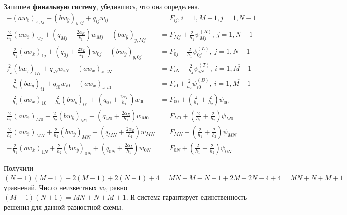 \documentclass[12pt, fleqn]{article}
\theoremstyle{definition}
\begin{document}
Запишем \textbf{финальную систему}, убедившись, что она определена.
\begin{align*}
  -\left(a w_{\overline{x}}\right)_{x, i j}-\left(b w_{\overline{y}}\right)_{y, i j}+q_{i j} w_{i j} &=F_{i j}, i=\overline{1, M-1}, j=\overline{1, N-1}\\
 \frac{2}{h_{1}}\left(a w_{\overline{x}}\right)_{M j} + \left(q_{M j}+\frac{2 \alpha_{R}}{h_{1}}\right) w_{M j}-\left(b w_{\overline{y}}\right)_{y, M j}&=F_{M j}+\frac{2}{h_{1}} \psi^{(R)}_{M j}, \; j=\overline{1, N-1} \\
-\frac{2}{h_{1}}\left(a w_{\overline{x}}\right)_{1 j}+\left(q_{0 j}+\frac{2 \alpha_{L}}{h_{1}}\right) w_{0 j}-\left(b w_{\overline{y}}\right)_{y, 0 j}&=F_{0 j}+\frac{2}{h_{1}} \psi^{(L)}_{0 j}, \; j=\overline{1, N-1}\\
\frac{2}{h_{2}}\left(b w_{\overline{y}}\right)_{i N} + q_{i N} w_{i N}-\left(a w_{\overline{x}}\right)_{x, i N}&=F_{i N}+\frac{2}{h_{2}} \psi^{(T)}_{i N},\;  i=\overline{1, M-1}  \\
-\frac{2}{h_{2}}\left(b w_{\overline{y}}\right)_{i 1}+q_{i 0} w_{i 0}-\left(a w_{\overline{x}}\right)_{x, i 0}&=F_{i 0}+\frac{2}{h_{2}} \psi^{(B)}_{i 0},\;  i=\overline{1, M-1} \\
-\frac{2}{h_{1}}\left(a w_{\overline{x}}\right)_{10} - \frac{2}{h_{2}} \left(b w_{\overline{y}}\right)_{01}+\left(q_{00}+ \frac{2\alpha_{L}}{h_{1}}\right) w_{00}&= F_{00}+\left(\frac{2}{h_{1}} + \frac{2}{h_{2}}\right) \psi_{00}\\
\frac{2}{h_{1}}\left(a w_{\overline{x}}\right)_{M 0}-\frac{2}{h_{2}}\left(b w_{\overline{y}}\right)_{M 1}+\left(q_{M 0}+\frac{2\alpha_{R}}{h_{1}}\right) w_{M 0} &= F_{M 0}+\left(\frac{2}{h_{1}}+\frac{2}{h_{2}}\right) \psi_{M 0}\\
\frac{2}{h_{1}}\left(a w_{\overline{x}}\right)_{M N}+\frac{2}{h_{2}}\left(b w_{\overline{y}}\right)_{M N}+\left(q_{M N}+\frac{2\alpha_{R}}{h_{1}}\right) w_{M N}&= F_{M N}+\left(\frac{2}{h_{1}}+\frac{2}{h_{2}}\right) \psi_{M N}\\
-\frac{2}{h_{1}}\left(a w_{\overline{x}}\right)_{1 N}+\frac{2}{h_{2}}\left(b w_{\overline{y}}\right)_{0 N}+\left(q_{0 N}+\frac{2\alpha_{L}}{h_{1}}\right) w_{0 N}&= F_{0 N}+\left(\frac{2}{h_{1}}+\frac{2}{h_{2}}\right) \psi_{0 N}
\end{align*}

Получили $(N-1)(M-1) + 2(M-1) + 2(N-1) + 4 = MN - M - N + 1 + 2M + 2N - 4 + 4 = MN + N + M + 1$ уравнений. Число неизвестных $w_{ij}$ равно $(M+1)(N+1) = MN + N + M + 1$. И система гарантирует единственность решения для данной разностной схемы.
\end{document}
